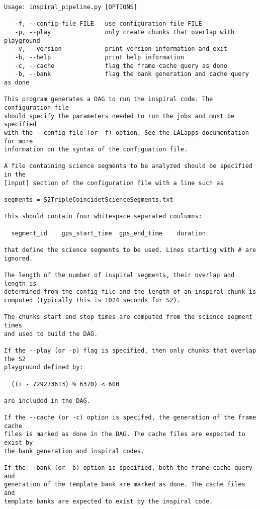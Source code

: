 \begin{verbatim}
Usage: inspiral_pipeline.py [OPTIONS]

   -f, --config-file FILE   use configuration file FILE
   -p, --play               only create chunks that overlap with playground
   -v, --version            print version information and exit
   -h, --help               print help information
   -c, --cache              flag the frame cache query as done
   -b, --bank               flag the bank generation and cache query as done

This program generates a DAG to run the inspiral code. The configuration file 
should specify the parameters needed to run the jobs and must be specified 
with the --config-file (or -f) option. See the LALapps documentation for more
information on the syntax of the configuation file.

A file containing science segments to be analyzed should be specified in the 
[input] section of the configuration file with a line such as

segments = S2TripleCoincidetScienceSegments.txt

This should contain four whitespace separated coulumns:

  segment_id    gps_start_time  gps_end_time    duration

that define the science segments to be used. Lines starting with # are ignored.

The length of the number of inspiral segments, their overlap and length is 
determined from the config file and the length of an inspiral chunk is
computed (typically this is 1024 seconds for S2).

The chunks start and stop times are computed from the science segment times
and used to build the DAG.

If the --play (or -p) flag is specified, then only chunks that overlap the S2
playground defined by:

  ((t - 729273613) % 6370) < 600

are included in the DAG.

If the --cache (or -c) option is specifed, the generation of the frame cache 
files is marked as done in the DAG. The cache files are expected to exist by
the bank generation and inspiral codes.

If the --bank (or -b) option is specified, both the frame cache query and
generation of the template bank are marked as done. The cache files and
template banks are expected to exist by the inspiral code.
\end{verbatim}



